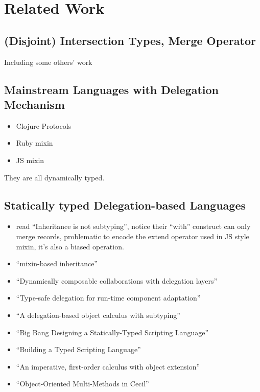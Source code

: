 \section{Related Work}

\subsection{(Disjoint) Intersection Types, Merge Operator}

Including some others' work


\subsection{Mainstream Languages with Delegation Mechanism}

\begin{itemize}
\item Clojure Protocols
\item Ruby mixin
\item JS mixin
\end{itemize}

They are all dynamically typed.

\subsection{Statically typed Delegation-based Languages}

\begin{itemize}
\item read ``Inheritance is not subtyping'', notice their ``with'' construct can
  only merge records, problematic to encode the extend operator used in JS style
  mixin, it's also a biased operation.

\item ``mixin-based inheritance''
\item ``Dynamically composable collaborations with delegation layers''

\item ``Type-safe delegation for run-time component adaptation''

\item ``A delegation-based object calculus with subtyping''

\item ``Big Bang Designing a Statically-Typed Scripting Language''

\item ``Building a Typed Scripting Language''

\item ``An imperative, first-order calculus with object extension''

\item ``Object-Oriented Multi-Methods in Cecil''

\end{itemize}

